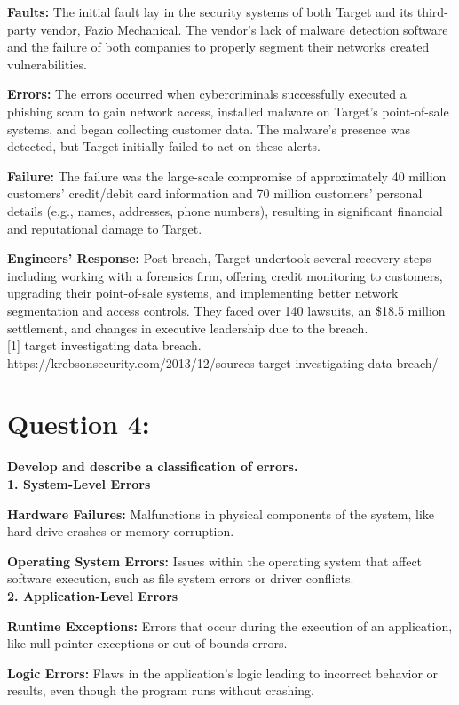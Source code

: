 \documentclass[12pt]{article}
\numberwithin{table}{section}
\begin{document}
\textbf{Faults:} 
The initial fault lay in the security systems of both Target and its third-party vendor, Fazio Mechanical. The vendor's lack of malware detection software and the failure of both companies to properly segment their networks created vulnerabilities.

\textbf{Errors:}
The errors occurred when cybercriminals successfully executed a phishing scam to gain network access, installed malware on Target's point-of-sale systems, and began collecting customer data. The malware's presence was detected, but Target initially failed to act on these alerts.

\textbf{Failure:}
The failure was the large-scale compromise of approximately 40 million customers' credit/debit card information and 70 million customers' personal details (e.g., names, addresses, phone numbers), resulting in significant financial and reputational damage to Target.

\textbf{Engineers' Response:}
Post-breach, Target undertook several recovery steps including working with a forensics firm, offering credit monitoring to customers, upgrading their point-of-sale systems, and implementing better network segmentation and access controls. They faced over 140 lawsuits, an \$18.5 million settlement, and changes in executive leadership due to the breach.\\

{\small [1] target investigating data breach. https://krebsonsecurity.com/2013/12/sources-target-investigating-data-breach/}

\section*{Question 4: } 
\textbf{Develop and describe a classification of errors.}
\\
\textbf{1. System-Level Errors}

\textbf{Hardware Failures:} Malfunctions in physical components of the system, like hard drive crashes or memory corruption.

\textbf{Operating System Errors:} Issues within the operating system that affect software execution, such as file system errors or driver conflicts.
\\
\textbf{2. Application-Level Errors}

\textbf{Runtime Exceptions:} Errors that occur during the execution of an application, like null pointer exceptions or out-of-bounds errors.

\textbf{Logic Errors:} Flaws in the application's logic leading to incorrect behavior or results, even though the program runs without crashing.
\end{document}
